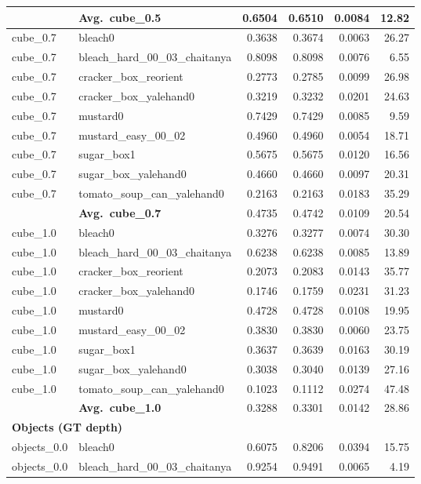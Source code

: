 \begin{longtable}{llrrrr}
  \cmidrule{2-6}
  & \textbf{Avg.~cube_0.5} & 0.6504 & 0.6510 & 0.0084 & 12.82 \\
  \midrule
  cube_0.7 & bleach0 & 0.3638 & 0.3674 & 0.0063 & 26.27 \\
  cube_0.7 & bleach\_hard\_00\_03\_chaitanya & 0.8098 & 0.8098 & 0.0076 & 6.55 \\
  cube_0.7 & cracker\_box\_reorient & 0.2773 & 0.2785 & 0.0099 & 26.98 \\
  cube_0.7 & cracker\_box\_yalehand0 & 0.3219 & 0.3232 & 0.0201 & 24.63 \\
  cube_0.7 & mustard0 & 0.7429 & 0.7429 & 0.0085 & 9.59 \\
  cube_0.7 & mustard\_easy\_00\_02 & 0.4960 & 0.4960 & 0.0054 & 18.71 \\
  cube_0.7 & sugar\_box1 & 0.5675 & 0.5675 & 0.0120 & 16.56 \\
  cube_0.7 & sugar\_box\_yalehand0 & 0.4660 & 0.4660 & 0.0097 & 20.31 \\
  cube_0.7 & tomato\_soup\_can\_yalehand0 & 0.2163 & 0.2163 & 0.0183 & 35.29 \\
  \cmidrule{2-6}
  & \textbf{Avg.~cube_0.7} & 0.4735 & 0.4742 & 0.0109 & 20.54 \\
  \midrule
  cube_1.0 & bleach0 & 0.3276 & 0.3277 & 0.0074 & 30.30 \\
  cube_1.0 & bleach\_hard\_00\_03\_chaitanya & 0.6238 & 0.6238 & 0.0085 & 13.89 \\
  cube_1.0 & cracker\_box\_reorient & 0.2073 & 0.2083 & 0.0143 & 35.77 \\
  cube_1.0 & cracker\_box\_yalehand0 & 0.1746 & 0.1759 & 0.0231 & 31.23 \\
  cube_1.0 & mustard0 & 0.4728 & 0.4728 & 0.0108 & 19.95 \\
  cube_1.0 & mustard\_easy\_00\_02 & 0.3830 & 0.3830 & 0.0060 & 23.75 \\
  cube_1.0 & sugar\_box1 & 0.3637 & 0.3639 & 0.0163 & 30.19 \\
  cube_1.0 & sugar\_box\_yalehand0 & 0.3038 & 0.3040 & 0.0139 & 27.16 \\
  cube_1.0 & tomato\_soup\_can\_yalehand0 & 0.1023 & 0.1112 & 0.0274 & 47.48 \\
  \cmidrule{2-6}
  & \textbf{Avg.~cube_1.0} & 0.3288 & 0.3301 & 0.0142 & 28.86 \\
  \midrule
\multicolumn{6}{l}{\textbf{Objects (GT depth)}} \\
\midrule
  objects_0.0 & bleach0 & 0.6075 & 0.8206 & 0.0394 & 15.75 \\
  objects_0.0 & bleach\_hard\_00\_03\_chaitanya & 0.9254 & 0.9491 & 0.0065 & 4.19 \\

\end{longtable}
